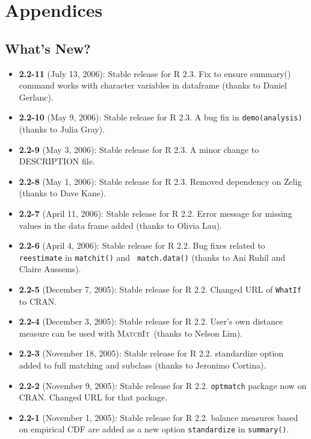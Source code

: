 \documentclass[oneside,letterpaper,12pt]{book}
\newcommand{\MatchIt}{\textsc{MatchIt}}
\begin{document}

\chapter{Appendices}

\section{What's New?}

\begin{itemize}
\item \textbf{2.2-11} (July 13, 2006): Stable release for R 2.3.
  Fix to ensure summary() command works with character variables in dataframe (thanks to Daniel Gerlanc).
\item \textbf{2.2-10} (May 9, 2006): Stable release for R 2.3.
  A bug fix in {\tt demo(analysis)} (thanks to Julia Gray).
\item \textbf{2.2-9} (May 3, 2006): Stable release for R 2.3.
  A minor change to DESCRIPTION file.
\item \textbf{2.2-8} (May 1, 2006): Stable release for R 2.3.
  Removed dependency on Zelig (thanks to Dave Kane).
\item \textbf{2.2-7} (April 11, 2006): Stable release for R 2.2.
  Error message for missing values in the data frame added
  (thanks to Olivia Lau).
\item \textbf{2.2-6} (April 4, 2006): Stable release for R 2.2.
  Bug fixes related to {\tt reestimate} in {\tt matchit()} and {\tt
  match.data()} (thanks to Ani Ruhil and Claire Aussems). 
\item \textbf{2.2-5} (December 7, 2005): Stable release for R 2.2.
  Changed URL of {\tt WhatIf} to CRAN.
\item \textbf{2.2-4} (December 3, 2005): Stable release for R 2.2.
  User's own distance measure can be used with \MatchIt\, (thanks to
  Nelson Lim).
\item \textbf{2.2-3} (November 18, 2005): Stable release for R 2.2.
  standardize option added to full matching and subclass (thanks to
  Jeronimo Cortina).
\item \textbf{2.2-2} (November 9, 2005): Stable release for R 2.2.
  {\tt optmatch} package now on CRAN. Changed URL for that package. 
\item \textbf{2.2-1} (November 1, 2005): Stable release for R 2.2.
  balance measures based on empirical CDF are added as a new option
  {\tt standardize} in {\tt summary()}.

\end{itemize}
\end{document}
